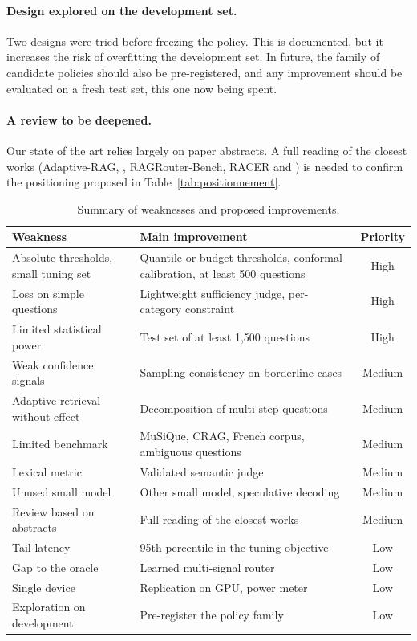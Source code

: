 \documentclass[11pt,a4paper]{article}
\begin{document}
\paragraph{Design explored on the development set.} Two designs were tried before freezing the policy.
This is documented, but it increases the risk of overfitting the development set. In future, the family
of candidate policies should also be pre-registered, and any improvement should be evaluated on a fresh
test set, this one now being spent.

\paragraph{A review to be deepened.} Our state of the art relies largely on paper abstracts. A full
reading of the closest works (Adaptive-RAG, \citealp{moskvoretskii2025adaptive}, RAGRouter-Bench, RACER
and \citealp{li2026beyond}) is needed to confirm the positioning proposed in
Table~\ref{tab:positionnement}.

\begin{table}[H]
\centering\small
\begin{tabularx}{\linewidth}{Y Y c}
\toprule
Weakness & Main improvement & Priority \\
\midrule
Absolute thresholds, small tuning set & Quantile or budget thresholds, conformal calibration, at least 500 questions & High \\
Loss on simple questions & Lightweight sufficiency judge, per-category constraint & High \\
Limited statistical power & Test set of at least 1,500 questions & High \\
Weak confidence signals & Sampling consistency on borderline cases & Medium \\
Adaptive retrieval without effect & Decomposition of multi-step questions & Medium \\
Limited benchmark & MuSiQue, CRAG, French corpus, ambiguous questions & Medium \\
Lexical metric & Validated semantic judge & Medium \\
Unused small model & Other small model, speculative decoding & Medium \\
Review based on abstracts & Full reading of the closest works & Medium \\
Tail latency & 95th percentile in the tuning objective & Low \\
Gap to the oracle & Learned multi-signal router & Low \\
Single device & Replication on GPU, power meter & Low \\
Exploration on development & Pre-register the policy family & Low \\
\bottomrule
\end{tabularx}
\caption{Summary of weaknesses and proposed improvements.}
\label{tab:faiblesses}
\end{table}
\end{document}
